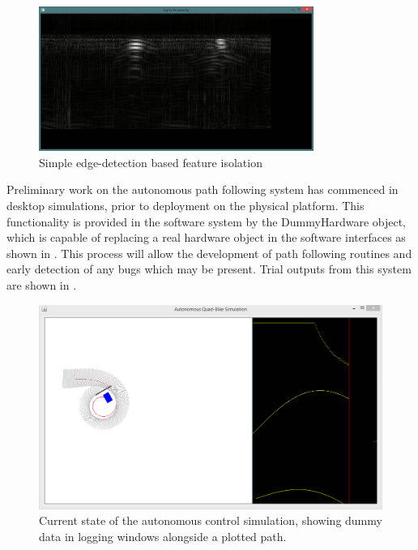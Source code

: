 \documentclass[main.tex]{subfiles}
\begin{document}
\begin{figure}[ht]
\includegraphics[width=0.8\textwidth]{7-Conclusion/edge-recognition.png}
\centering
\caption{Simple edge-detection based feature isolation}
\end{figure}
Preliminary work on the autonomous path following system has commenced in desktop simulations, prior to deployment on the physical platform. This functionality is provided in the software system by the DummyHardware object, which is capable of replacing a real hardware object in the software interfaces as shown in . This process will allow the development of path following routines and early detection of any bugs which may be present. Trial outputs from this system are shown in .

\begin{figure}[ht]
\includegraphics[width=\textwidth]{7-Conclusion/fake2.png}
\centering
\caption[Current state of the autonomous control simulation]{Current state of the autonomous control simulation, showing dummy data in logging windows alongside a plotted path.}
\end{figure}
\end{document}
